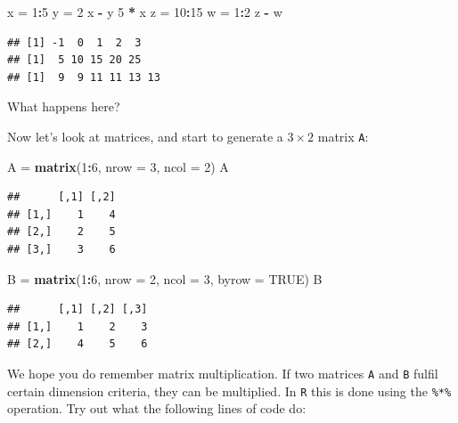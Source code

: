 \documentclass[]{article}
\newenvironment{Shaded}{\begin{snugshade}}{\end{snugshade}}
\newcommand{\KeywordTok}[1]{\textcolor[rgb]{0.13,0.29,0.53}{\textbf{#1}}}
\newcommand{\DataTypeTok}[1]{\textcolor[rgb]{0.13,0.29,0.53}{#1}}
\newcommand{\DecValTok}[1]{\textcolor[rgb]{0.00,0.00,0.81}{#1}}
\newcommand{\StringTok}[1]{\textcolor[rgb]{0.31,0.60,0.02}{#1}}
\newcommand{\OtherTok}[1]{\textcolor[rgb]{0.56,0.35,0.01}{#1}}
\newcommand{\OperatorTok}[1]{\textcolor[rgb]{0.81,0.36,0.00}{\textbf{#1}}}
\newcommand{\NormalTok}[1]{#1}
\begin{document}
\begin{Shaded}
\begin{Highlighting}[]
\NormalTok{x =}\StringTok{ }\DecValTok{1}\OperatorTok{:}\DecValTok{5}
\NormalTok{y =}\StringTok{ }\DecValTok{2}
\NormalTok{x }\OperatorTok{-}\StringTok{ }\NormalTok{y}
\DecValTok{5} \OperatorTok{*}\StringTok{ }\NormalTok{x}
\NormalTok{z =}\StringTok{ }\DecValTok{10}\OperatorTok{:}\DecValTok{15}
\NormalTok{w =}\StringTok{ }\DecValTok{1}\OperatorTok{:}\DecValTok{2}
\NormalTok{z }\OperatorTok{-}\StringTok{ }\NormalTok{w}
\end{Highlighting}
\end{Shaded}

\begin{verbatim}
## [1] -1  0  1  2  3
## [1]  5 10 15 20 25
## [1]  9  9 11 11 13 13
\end{verbatim}

What happens here?

Now let's look at matrices, and start to generate a \(3\times 2\) matrix
\texttt{A}:

\begin{Shaded}
\begin{Highlighting}[]
\NormalTok{A =}\StringTok{ }\KeywordTok{matrix}\NormalTok{(}\DecValTok{1}\OperatorTok{:}\DecValTok{6}\NormalTok{, }\DataTypeTok{nrow =} \DecValTok{3}\NormalTok{, }\DataTypeTok{ncol =} \DecValTok{2}\NormalTok{)}
\NormalTok{A}
\end{Highlighting}
\end{Shaded}

\begin{verbatim}
##      [,1] [,2]
## [1,]    1    4
## [2,]    2    5
## [3,]    3    6
\end{verbatim}

\begin{Shaded}
\begin{Highlighting}[]
\NormalTok{B =}\StringTok{ }\KeywordTok{matrix}\NormalTok{(}\DecValTok{1}\OperatorTok{:}\DecValTok{6}\NormalTok{, }\DataTypeTok{nrow =} \DecValTok{2}\NormalTok{, }\DataTypeTok{ncol =} \DecValTok{3}\NormalTok{, }\DataTypeTok{byrow =} \OtherTok{TRUE}\NormalTok{)}
\NormalTok{B}
\end{Highlighting}
\end{Shaded}

\begin{verbatim}
##      [,1] [,2] [,3]
## [1,]    1    2    3
## [2,]    4    5    6
\end{verbatim}

We hope you do remember matrix multiplication. If two matrices
\texttt{A} and \texttt{B} fulfil certain dimension criteria, they can be
multiplied. In \texttt{R} this is done using the \texttt{\%*\%}
operation. Try out what the following lines of code do:
\end{document}

